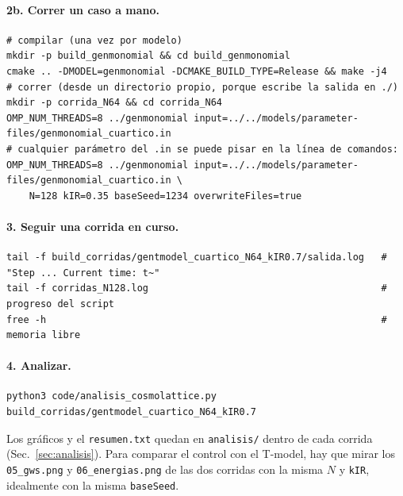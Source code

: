 \documentclass[11pt]{article}
\begin{document}
            \paragraph{2b. Correr un caso a mano.}
            {\footnotesize\begin{verbatim}
# compilar (una vez por modelo)
mkdir -p build_genmonomial && cd build_genmonomial
cmake .. -DMODEL=genmonomial -DCMAKE_BUILD_TYPE=Release && make -j4
# correr (desde un directorio propio, porque escribe la salida en ./)
mkdir -p corrida_N64 && cd corrida_N64
OMP_NUM_THREADS=8 ../genmonomial input=../../models/parameter-files/genmonomial_cuartico.in
# cualquier parámetro del .in se puede pisar en la línea de comandos:
OMP_NUM_THREADS=8 ../genmonomial input=../../models/parameter-files/genmonomial_cuartico.in \
    N=128 kIR=0.35 baseSeed=1234 overwriteFiles=true
            \end{verbatim}}

            \paragraph{3. Seguir una corrida en curso.}
            {\footnotesize\begin{verbatim}
tail -f build_corridas/gentmodel_cuartico_N64_kIR0.7/salida.log   # "Step ... Current time: t~"
tail -f corridas_N128.log                                         # progreso del script
free -h                                                           # memoria libre
            \end{verbatim}}

            \paragraph{4. Analizar.}
            {\footnotesize\begin{verbatim}
python3 code/analisis_cosmolattice.py build_corridas/gentmodel_cuartico_N64_kIR0.7
            \end{verbatim}}
            Los gráficos y el \texttt{resumen.txt} quedan en \texttt{analisis/} dentro de cada corrida (Sec.~\ref{sec:analisis}). Para comparar el control con el T-model, hay que mirar los \texttt{05\_gws.png} y \texttt{06\_energias.png} de las dos corridas con la misma $N$ y \texttt{kIR}, idealmente con la misma \texttt{baseSeed}.

    \IfFileExists{modelos/monomial.tex}{}{}
\end{document}
